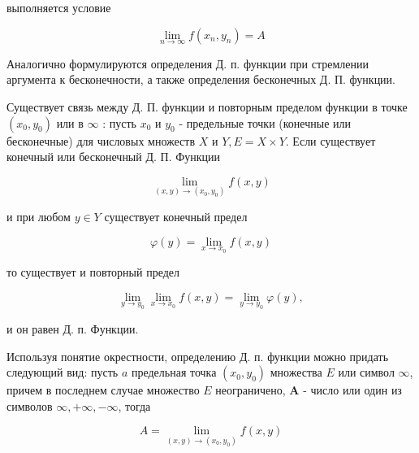 \documentclass[10pt]{article}
\begin{document}
выполняется условие



\[

\lim _{n \rightarrow \infty} f\left(x_{n}, y_{n}\right)=A

\]



Аналогично формулируются определения Д. п. функции при стремлении аргумента к бесконечности, а также определения бесконечных Д. П. функции.



Существует связь между Д. П. функции и повторным пределом функции в точке $\left(x_{0}, y_{0}\right)$ или в $\infty$ : пусть $x_{0}$ и $y_{0}$ - предельные точки (конечные или бесконечные) для числовых множеств $X$ и $Y, E=X \times Y$. Если существует конечный или бесконечный Д. П. Функции



\[

\lim _{(x, y) \rightarrow\left(x_{0}, y_{0}\right)} f(x, y)

\]



и при любом $y \in Y$ существует конечный предел



\[

\varphi(y)=\lim _{x \rightarrow x_{0}} f(x, y)

\]



то существует и повторный предел



\[

\lim _{y \rightarrow y_{0}} \lim _{x \rightarrow x_{0}} f(x, y)=\lim _{y \rightarrow y_{0}} \varphi(y),

\]



и он равен Д. п. Функции.



Используя понятие окрестности, определению Д. п. функции можно придать следующий вид: пусть $a$ предельная точка $\left(x_{0}, y_{0}\right)$ множества $E$ или символ $\infty$, причем в последнем случае множество $E$ неограничено, $\boldsymbol{A}$ - число или один из символов $\infty,+\infty,-\infty$, тогда



\[

A=\lim _{(x, y) \rightarrow\left(x_{0}, y_{0}\right)} f(x, y)

\]
\end{document}

